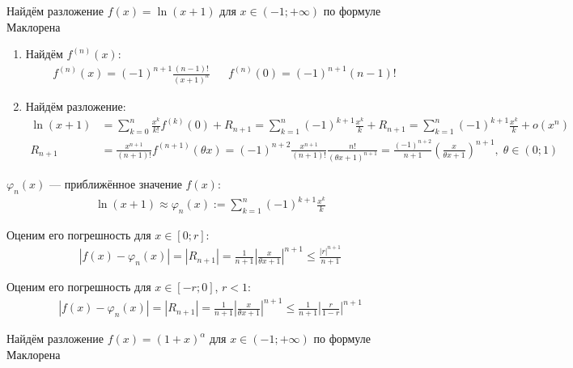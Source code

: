 \documentclass{article}
\begin{document}
Найдём разложение $f(x)=\ln(x+1)$ для $x\in (-1;+\infty)$ по формуле Маклорена

\begin{enumerate}
	\item{}Найдём $f^{(n)}(x)$:
	\begin{align*}
		 & f^{(n)}(x)=(-1)^{n+1}\frac{(n-1)!}{(x+1)^{n}} &  & f^{(n)}(0)=(-1)^{n+1}(n-1)!
	\end{align*}
	\item{}Найдём разложение:
	\begin{align*}
		\ln(x+1) & =\sum_{k=0}^{n}\frac{x^{k}}{k!}f^{(k)}(0)+R_{n+1}=\sum_{k=1}^{n}(-1)^{k+1}\frac{x^{k}}{k}+R_{n+1}
		=\sum_{k=1}^{n}(-1)^{k+1}\frac{x^{k}}{k}+o(x^{n})                                                                   \\
		R_{n+1}  & =\frac{x^{n+1}}{(n+1)!}f^{(n+1)}(\theta x)=(-1)^{n+2}\frac{x^{n+1}}{(n+1)!}\frac{n!}{(\theta x+1)^{n+1}}
		=\frac{(-1)^{n+2}}{n+1}\left(\frac{x}{\theta x+1}\right)^{n+1},\;\theta\in(0;1)
	\end{align*}
\end{enumerate}

$\varphi_{n}(x)$ --- приближённое значение $f(x)$:
\begin{align*}
	\ln(x+1)\approx\varphi_{n}(x):=\sum_{k=1}^{n}(-1)^{k+1}\frac{x^{k}}{k}
\end{align*}

\pagebreak

Оценим его погрешность для $x\in[0;r]$:
\begin{align*}
	|f(x)-\varphi_{n}(x)|=|R_{n+1}|=\frac{1}{n+1}\left|\frac{x}{\theta x+1}\right|^{n+1}\leq\frac{|r|^{n+1}}{n+1}
\end{align*}

Оценим его погрешность для $x\in[-r;0]$, $r<1$:
\begin{align*}
	|f(x)-\varphi_{n}(x)|=|R_{n+1}|=\frac{1}{n+1}\left|\frac{x}{\theta x+1}\right|^{n+1}\leq\frac{1}{n+1}\left|\frac{r}{1-r}\right|^{n+1}
\end{align*}


Найдём разложение $f(x)=(1+x)^{\alpha}$ для $x\in (-1;+\infty)$ по формуле Маклорена
\end{document}
